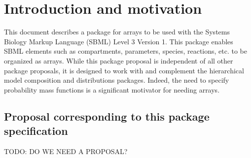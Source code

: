 
\section{Introduction and motivation}
\label{intro}

This document describes a package for arrays to be used with the Systems Biology Markup Language (SBML) Level 3 Version 1.  This package enables SBML elements such as compartments, parameters, species, reactions, etc. to be organized as arrays.  While this package proposal is independent of all other package proposals, it is designed to work with and complement the hierarchical model composition and distributions packages.  Indeed, the need to specify probability mass functions is a significant motivator for needing arrays.

\subsection{Proposal corresponding to this package specification}

TODO: DO WE NEED A PROPOSAL?





